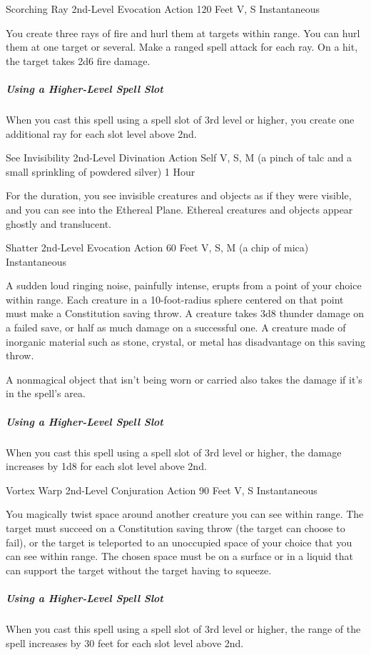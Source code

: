 \documentclass[letterpaper,openany,oneside,twocolumn]{book}
\begin{document}
\DndSpellHeader
  {Scorching Ray}
  {2nd-Level Evocation}
  {Action}
  {120 Feet}
  {V, S}
  {Instantaneous}

You create three rays of fire and hurl them at targets within range. You can hurl them at one target or several. Make a ranged spell attack for each ray. On a hit, the target takes 2d6 fire damage.

\subparagraph*{Using a Higher-Level Spell Slot} When you cast this spell using a spell slot of 3rd level or higher, you create one additional ray for each slot level above 2nd.

\DndSpellHeader
  {See Invisibility}
  {2nd-Level Divination}
  {Action}
  {Self}
  {V, S, M (a pinch of talc and a small sprinkling of powdered silver)}
  {1 Hour}
  
For the duration, you see invisible creatures and objects as if they were visible, and you can see into the Ethereal Plane. Ethereal creatures and objects appear ghostly and translucent.

\DndSpellHeader
  {Shatter}
  {2nd-Level Evocation}
  {Action}
  {60 Feet}
  {V, S, M (a chip of mica)}
  {Instantaneous}

A sudden loud ringing noise, painfully intense, erupts from a point of your choice within range. Each creature in a 10-foot-radius sphere centered on that point must make a Constitution saving throw. A creature takes 3d8 thunder damage on a failed save, or half as much damage on a successful one. A creature made of inorganic material such as stone, crystal, or metal has disadvantage on this saving throw.

A nonmagical object that isn't being worn or carried also takes the damage if it's in the spell's area.

\subparagraph*{Using a Higher-Level Spell Slot} When you cast this spell using a spell slot of 3rd level or higher, the damage increases by 1d8 for each slot level above 2nd.

\DndSpellHeader
  {Vortex Warp}
  {2nd-Level Conjuration}
  {Action}
  {90 Feet}
  {V, S}
  {Instantaneous}

You magically twist space around another creature you can see within range. The target must succeed on a Constitution saving throw (the target can choose to fail), or the target is teleported to an unoccupied space of your choice that you can see within range. The chosen space must be on a surface or in a liquid that can support the target without the target having to squeeze.

\subparagraph*{Using a Higher-Level Spell Slot} When you cast this spell using a spell slot of 3rd level or higher, the range of the spell increases by 30 feet for each slot level above 2nd.
\end{document}
